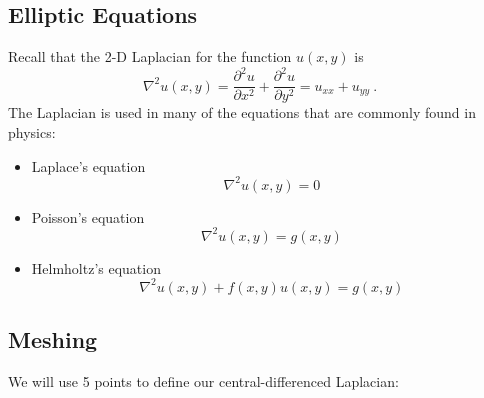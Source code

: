 \documentclass[12pt]{article}
\begin{document}
\subsection*{Elliptic Equations}

Recall that the 2-D Laplacian for the function $u(x,y)$ is
%
\begin{equation}
\nabla^2 u(x,y) = \frac{\partial^2 u}{\partial x^2} + \frac{\partial^2 u}{\partial y^2} = u_{xx} + u_{yy} \:.\nonumber
\end{equation}
%
The Laplacian is used in many of the equations that are commonly found in physics:
%
\begin{itemize}
\item Laplace's equation
\[\nabla^2 u(x,y) = 0\]

\item Poisson's equation 
\[\nabla^2 u(x,y) = g(x,y)\]

\item Helmholtz's equation
\[\nabla^2 u(x,y) +f(x,y)u(x,y) = g(x,y)\]
\end{itemize}

\subsection*{Meshing}

We will use 5 points to define our central-differenced Laplacian:
\end{document}
